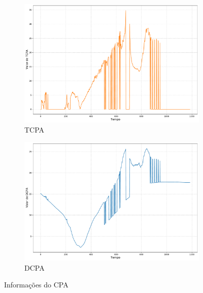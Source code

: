         \begin{figure}[H]
		\centering
		\begin{subfigure}{1\textwidth}
            \centering
            \includegraphics[width=\textwidth]{fig/chap5/crossing_right_tcpa.pdf}
            \caption{TCPA}
            \label{fig:chap5_crossing_right_tcpa}
        \end{subfigure}
        \begin{subfigure}{1\textwidth}
            \centering
            \includegraphics[width=\textwidth]{fig/chap5/crossing_right_dcpa.pdf}
            \caption{DCPA}
            \label{fig:chap5_crossing_right_dcpa}
        \end{subfigure}
        
        \caption{Informações do CPA}
        \label{fig:chap5_crossing_right_cpa}
        \end{figure}
        
